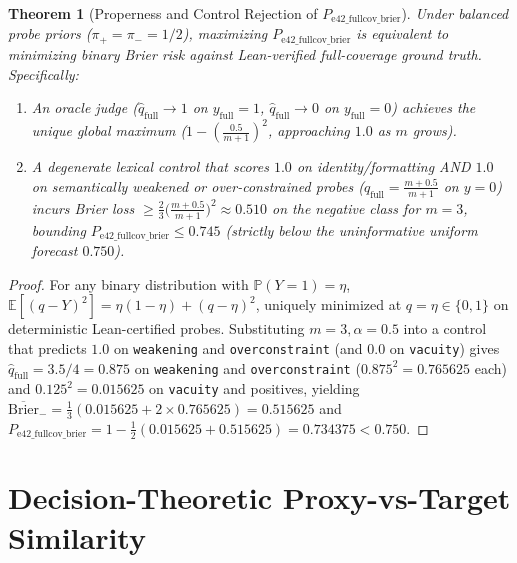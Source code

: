 \documentclass[11pt]{article}
\newtheorem{theorem}{Theorem}
\begin{document}
\begin{theorem}[Properness and Control Rejection of $P_{\mathrm{e42\_fullcov\_brier}}$]
Under balanced probe priors ($\pi_+ = \pi_- = 1/2$), maximizing $P_{\mathrm{e42\_fullcov\_brier}}$ is equivalent to minimizing binary Brier risk against Lean-verified full-coverage ground truth. Specifically:
\begin{enumerate}
\item An oracle judge ($\hat q_{\mathrm{full}} \to 1$ on $y_{\mathrm{full}}=1$, $\hat q_{\mathrm{full}} \to 0$ on $y_{\mathrm{full}}=0$) achieves the unique global maximum ($1 - (\frac{0.5}{m+1})^2$, approaching $1.0$ as $m$ grows).
\item A degenerate lexical control that scores $1.0$ on identity/formatting AND $1.0$ on semantically weakened or over-constrained probes ($\hat q_{\mathrm{full}} = \frac{m+0.5}{m+1}$ on $y=0$) incurs Brier loss $\ge \frac{2}{3}\bigl(\frac{m+0.5}{m+1}\bigr)^2 \approx 0.510$ on the negative class for $m=3$, bounding $P_{\mathrm{e42\_fullcov\_brier}} \le 0.745$ (strictly below the uninformative uniform forecast $0.750$).
\end{enumerate}
\end{theorem}

\begin{proof}
For any binary distribution with $\mathbb{P}(Y=1) = \eta$, $\mathbb{E}[(q - Y)^2] = \eta(1-\eta) + (q - \eta)^2$, uniquely minimized at $q = \eta \in \{0,1\}$ on deterministic Lean-certified probes. Substituting $m=3, \alpha=0.5$ into a control that predicts $1.0$ on \texttt{weakening} and \texttt{overconstraint} (and $0.0$ on \texttt{vacuity}) gives $\hat q_{\mathrm{full}} = 3.5/4 = 0.875$ on \texttt{weakening} and \texttt{overconstraint} ($0.875^2 = 0.765625$ each) and $0.125^2 = 0.015625$ on \texttt{vacuity} and positives, yielding $\overline{\mathrm{Brier}}_{-} = \frac{1}{3}(0.015625 + 2 \times 0.765625) = 0.515625$ and $P_{\mathrm{e42\_fullcov\_brier}} = 1 - \frac{1}{2}(0.015625 + 0.515625) = 0.734375 < 0.750$.
\end{proof}

\section{Decision-Theoretic Proxy-vs-Target Similarity}
\end{document}

